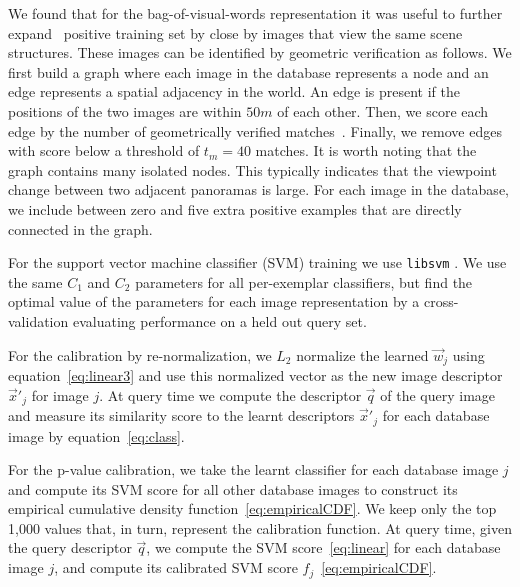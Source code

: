       We found that for the bag-of-visual-words representation it was useful to further expand~\cite{Chum07b} positive training set by close by images that view the same scene structures. These images can be identified by geometric verification \cite{Philbin07} \textcolor{petr} {as follows.}
      \textcolor{petr}{
      We first build a graph where each image in the database represents a node and an edge represents a spatial adjacency in the world. An edge is present if the positions of the two images are within $50m$ of each other.
      Then, we score each edge by the number of geometrically verified matches~\cite{Philbin07}. Finally, we remove edges with score below a threshold of $t_m = 40$ matches. %
      It is worth noting that the graph contains many isolated nodes. This typically indicates that the viewpoint change between two adjacent panoramas is large. For each image in the database, we include between zero and five extra positive examples that are directly connected in the graph.
      }

      For the support vector machine classifier (SVM) training we use {\tt libsvm} \cite{libsvm}. We use the same $C_1$ and $C_2$ parameters for all per-exemplar classifiers, but find the optimal value of the parameters for each image representation by a cross-validation evaluating performance on a held out query set.

      For the calibration by re-normalization, we $L_2$ normalize the learned $\vec{w}_j$ using equation~\eqref{eq:linear3} and use this normalized vector as the new image descriptor $\vec{x}'_j$ for image $j$. At query time we compute the descriptor $\vec{q}$ of the query image and measure its similarity score to the learnt descriptors $\vec{x}'_j$ for each database image by equation~\eqref{eq:class}.

      For the p-value calibration, we take the learnt classifier for each database image $j$ and compute its SVM score for all other database images to construct its empirical cumulative density function~\eqref{eq:empiricalCDF}. We keep only the top 1,000 values that, in turn, represent the calibration function. At query time, given the query descriptor $\vec{q}$, we compute the SVM score~\eqref{eq:linear} for each database image $j$, and compute its calibrated SVM score $f_j$~\eqref{eq:empiricalCDF}.



